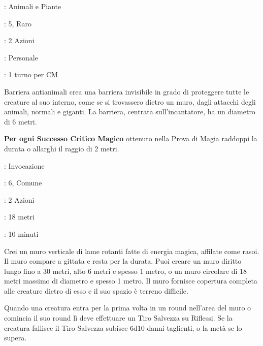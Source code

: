 \begin{multicols}{2}
\noindent\colorbox{OBSSgold!10}{
\begin{minipage}{0.95\linewidth}
\begin{description}[noitemsep, topsep=0pt, parsep=0pt, partopsep=0pt, leftmargin=0cm, labelwidth=1.3cm]
	\item[\textbf{Lista}]: Animali e Piante
	\item[\textbf{Livello}]: 5, Raro
	\item[\textbf{Lancio}]: 2 Azioni
	\item[\textbf{Gittata}]: Personale
	\item[\textbf{Durata}]: 1 turno per CM
\end{description}
\end{minipage}}\smallskip

Barriera antianimali crea una barriera invisibile in grado di proteggere tutte le creature al suo interno, come se si trovassero dietro un muro, dagli attacchi degli animali, normali e giganti. La barriera, centrata sull'incantatore, ha un diametro di 6 metri.

\textbf{Per ogni Successo Critico Magico} ottenuto nella Prova di Magia raddoppi la durata o allarghi il raggio di 2 metri.

\noindent\colorbox{OBSSgold!10}{
\begin{minipage}{0.95\linewidth}
\begin{description}[noitemsep, topsep=0pt, parsep=0pt, partopsep=0pt, leftmargin=0cm, labelwidth=1.3cm]
	\item[\textbf{Lista}]: Invocazione
	\item[\textbf{Livello}]: 6, Comune
	\item[\textbf{Lancio}]: 2 Azioni
	\item[\textbf{Gittata}]: 18 metri
	\item[\textbf{Durata}]: 10 minuti
\end{description}
\end{minipage}}\smallskip

Crei un muro verticale di lame rotanti fatte di energia magica, affilate come rasoi. Il muro compare a gittata e resta per la durata. Puoi creare un muro diritto lungo fino a 30 metri, alto 6 metri e spesso 1 metro, o un muro circolare di 18 metri massimo di diametro e spesso 1 metro. Il muro fornisce copertura completa alle creature dietro di esso e il suo spazio è terreno difficile.

Quando una creatura entra per la prima volta in un round nell'area del muro o comincia il suo round lì deve effettuare un Tiro Salvezza su Riflessi. Se la creatura fallisce il Tiro Salvezza subisce 6d10 danni taglienti, o la metà se lo supera.


\end{multicols}
